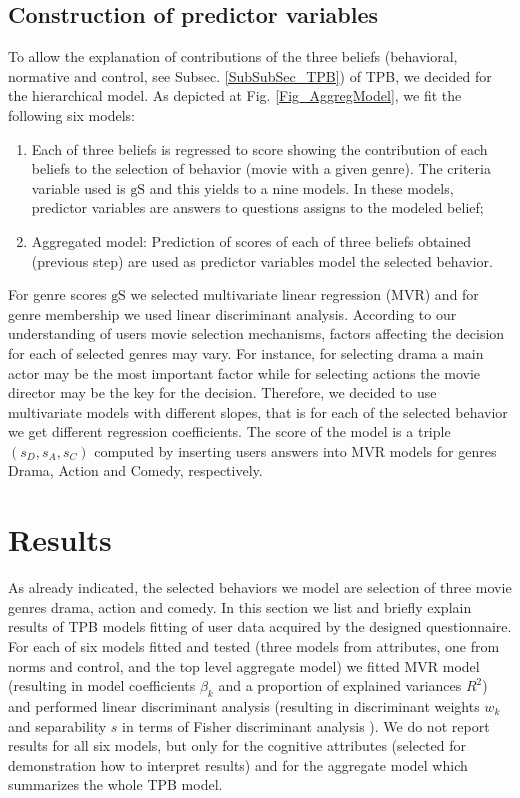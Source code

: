 \documentclass{llncs}
\def\gS{{\mbox{gS}}}
\begin{document}
\subsection{Construction of predictor variables}\label{SubSec_PredVarConstr} 

To allow the explanation of contributions of the three beliefs (behavioral, normative and control, see Subsec. \ref{SubSubSec_TPB}) of TPB, we decided for the hierarchical model. As depicted at Fig. \ref{Fig_AggregModel}, we fit the following six models:
\begin{enumerate}
 \item Each of three beliefs is regressed to score showing the contribution of each beliefs to the selection of behavior (movie with a given genre). The criteria variable used is $\gS$ and this yields to a nine models. In these models, predictor variables are answers to questions assigns to the modeled belief;
 \item Aggregated model: Prediction of scores of each of three beliefs obtained (previous step) are used as predictor variables model the selected behavior. 
\end{enumerate}
For genre scores $\gS$ we selected multivariate linear regression (MVR) and for genre membership we used linear discriminant analysis. 
According to our understanding of users movie selection mechanisms, factors affecting the decision for each of selected genres may vary. For instance, for selecting drama a main actor may be the most important factor while for selecting actions the movie director   may be the key for the decision. Therefore, we decided to use multivariate models with different slopes, that is for each of the selected behavior we get different regression coefficients. The score of the model is a triple $(s_D, s_A, s_C)$ computed by inserting users answers into MVR models for genres Drama, Action and Comedy, respectively.  


\section{Results}\label{Sec_Results}

As already indicated, the selected behaviors we model are selection of three movie genres drama, action and comedy. In this section we list and briefly explain results of TPB models fitting of user data acquired by the designed questionnaire.  For each of six models fitted and tested (three models from attributes, one from norms and control, and the top level aggregate model) we fitted MVR model (resulting in model coefficients $\beta_k$ and a proportion of explained variances $R^2$) and performed linear discriminant analysis (resulting in discriminant weights $w_k$ and separability $s$ in terms of Fisher discriminant analysis \cite{RencherChristensen201207}). We do not report results for all six models, but only for the cognitive attributes (selected for demonstration how to interpret results) and for the aggregate model which summarizes the whole TPB model. 
\end{document}
